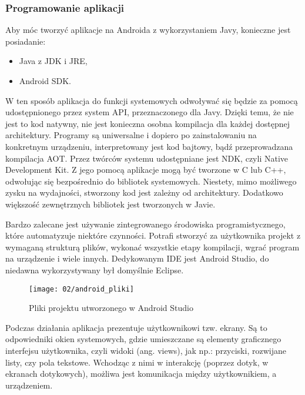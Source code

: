 \subsubsection*{Programowanie aplikacji}
Aby móc tworzyć aplikacje na Androida z wykorzystaniem Javy, konieczne jest posiadanie:

\begin{itemize}
	\item Java z JDK i JRE,
	\item Android SDK.
\end{itemize}

W ten sposób aplikacja do funkcji systemowych odwoływać się będzie za pomocą udostępnionego przez system API, przeznaczonego dla Javy. Dzięki temu, że nie jest to kod natywny, nie jest konieczna osobna kompilacja dla każdej dostępnej architektury. Programy są uniwersalne i dopiero po zainstalowaniu na konkretnym urządzeniu, interpretowany jest kod bajtowy, bądź przeprowadzana kompilacja AOT. Przez twórców systemu udostępniane jest NDK, czyli Native Development Kit. Z jego pomocą aplikacje mogą być tworzone w C lub C++, odwołując się bezpośrednio do bibliotek systemowych. Niestety, mimo możliwego zysku na wydajności, stworzony kod jest zależny od architektury. Dodatkowo większość zewnętrznych bibliotek jest tworzonych w Javie. 

Bardzo zalecane jest używanie zintegrowanego środowiska programistycznego, które automatyzuje niektóre czynności. Potrafi stworzyć za użytkownika projekt z wymaganą strukturą plików, wykonać wszystkie etapy kompilacji, wgrać program na urządzenie i wiele innych. Dedykowanym IDE jest Android Studio, do niedawna wykorzystywany był domyślnie Eclipse.

\begin{figure}[h]
	\begin{center}
		\texttt{[image: 02/android\_pliki]}
	\end{center}
	\caption{Pliki projektu utworzonego w Android Studio}
	\vspace{-0.3cm}
\end{figure}

Podczas działania aplikacja prezentuje użytkownikowi tzw. ekrany. Są to odpowiedniki okien systemowych, gdzie umieszczane są elementy graficznego interfejsu użytkownika, czyli widoki (ang. views), jak np.: przyciski, rozwijane listy, czy pola tekstowe. Wchodząc z nimi w interakcję (poprzez dotyk, w ekranach dotykowych), możliwa jest komunikacja między użytkownikiem, a urządzeniem. 

